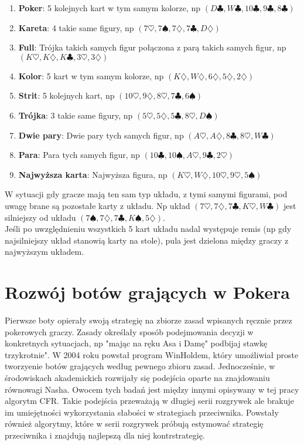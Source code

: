 \documentclass[licencjacka]{pracamgr}
\begin{document}
\begin{enumerate}
\item \textbf{Poker}: 5 kolejnych kart w tym samym kolorze, np $(D\clubsuit, W\clubsuit, 10\clubsuit, 9\clubsuit, 8\clubsuit)$ 
\item \textbf{Kareta}: 4 takie same figury, np $(7\heartsuit, 7\spadesuit, 7\diamondsuit, 7\clubsuit, D\diamondsuit)$
\item \textbf{Full}: Trójka takich samych figur połączona z parą takich samych figur, np $(K\heartsuit, K\diamondsuit, K\clubsuit, 3\heartsuit, 3\diamondsuit)$ 
\item \textbf{Kolor}: 5 kart w tym samym kolorze, np $(K\diamondsuit, W\diamondsuit, 6\diamondsuit, 5\diamondsuit, 2\diamondsuit)$
\item \textbf{Strit}: 5 kolejnych kart, np $(10\heartsuit, 9\diamondsuit, 8\heartsuit, 7\clubsuit, 6\spadesuit)$
\item \textbf{Trójka}: 3 takie same figury, np $(5\heartsuit, 5\diamondsuit, 5\clubsuit, 8\heartsuit, D\spadesuit)$
\item \textbf{Dwie pary}: Dwie pary tych samych figur, np $(A\heartsuit, A\diamondsuit, 8\clubsuit, 8\heartsuit, W\clubsuit)$
\item \textbf{Para}: Para tych samych figur, np $(10\clubsuit, 10\spadesuit, A\heartsuit, 9\clubsuit, 2\heartsuit)$
\item \textbf{Najwyższa karta}: Najwyższa figura, np $(K\heartsuit, W\diamondsuit, 10\heartsuit, 9\heartsuit, 5\spadesuit)$
\end{enumerate}

\noindent
W sytuacji gdy gracze mają ten sam typ układu, z tymi samymi figurami, pod uwagę brane są pozostałe karty z układu. Np
układ $(7\heartsuit, 7\diamondsuit, 7\clubsuit, K\heartsuit, W\clubsuit)$ jest silniejszy od układu
$(7\spadesuit, 7\diamondsuit, 7\clubsuit, K\spadesuit, 5\diamondsuit)$. \\

\noindent
Jeśli po uwzględnieniu wszystkich 5 kart układu nadal występuje remis (np gdy najsilniejszy układ stanowią karty na stole),
pula jest dzielona między graczy z najwyższym układem.

\section{Rozwój botów grających w Pokera}

Pierwsze boty opierały swoją strategię na zbiorze zasad wpisanych ręcznie przez pokerowych graczy. Zasady określały
sposób podejmowania decyzji w konkretnych sytuacjach, np "mając na ręku Asa i Damę" podbijaj stawkę trzykrotnie".
W 2004 roku powstał program WinHoldem, który umożliwiał proste tworzyenie botów grających według pewnego zbioru zasad.
Jednocześnie, w środowiskach akademickich rozwijały się podejścia oparte na znajdowaniu równowagi Nasha. Owocem tych
badań jest między innymi opisywany w tej pracy algorytm CFR. Takie podejścia przeważają w długiej serii rozgrywek ale
brakuje im umiejętności wykorzystania słabości w strategiach przeciwnika. Powstały również algorytmy, które w serii
rozgrywek próbują estymować strategię przeciwnika i znajdują najlepszą dla niej kontrstrategię. \cite{exploit}
\end{document}
